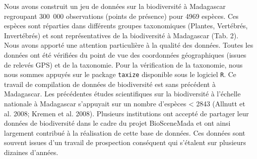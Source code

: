 \documentclass[12pt,]{article}
\begin{document}
Nous avons construit un jeu de données sur la biodiversité à Madagascar
regroupant 300~000 observations (points de présence) pour 4969 espèces.
Ces espèces sont réparties dans différents groupes taxonomiques
(Plantes, Vertébrés, Invertébrés) et sont représentatives de la
biodiversité à Madagascar (Tab. 2). Nous avons apporté une attention
particulière à la qualité des données. Toutes les données ont été
vérifiées du point de vue des coordonnées géographiques (issues de
relevés GPS) et de la taxonomie. Pour la vérification de la taxonomie,
nous nous sommes appuyés sur le package \texttt{taxize} disponible sous
le logiciel \texttt{R}. Ce travail de compilation de données de
biodiversité est sans précédent à Madagascar. Les précédentes études
scientifiques sur la biodiversité à l'échelle nationale à Madagascar
s'appuyait sur un nombre d'espèces \textless{} 2843 (Allnutt et al.
2008; Kremen et al. 2008). Plusieurs institutions ont accepté de
partager leur données de biodiversité dans le cadre du projet
BioSceneMada et ont ainsi largement contribué à la réalisation de cette
base de données. Ces données sont souvent issues d'un travail de
prospection conséquent qui s'étalent sur plusieurs dizaines d'années.
\end{document}
